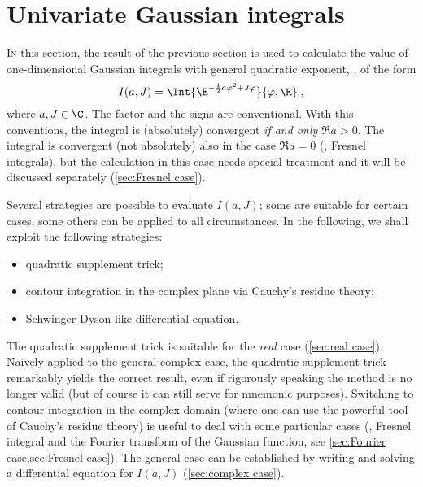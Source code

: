 \section{Univariate Gaussian integrals}
\label{sec:univariate gaussian integrals}

\ChangeExp

\lettrine{I}{n} this section, the result of the previous section is used to
calculate the value of 
one-dimensional Gaussian integrals with general quadratic exponent, \ie, of the
form
\begin{equation}\label{eq:ZaJ}
   I(a,J) = \Int{\E^{-\frac{1}{2} a \varphi^{2} + J\varphi }}{\varphi, \R}  \; ,
\end{equation}
where $a,J\in\C$. The factor  and the signs are conventional.
With this conventions, the integral is (absolutely) convergent \emph{if and
   only} $\Re a > 0$. The integral is convergent (not
absolutely) also in the case $\Re a = 0$ (\ie, Fresnel integrals), but
the calculation in this case needs special treatment and it will be discussed
separately (\cref{sec:Fresnel case}).

Several strategies are possible to evaluate $I(a,J)$; some are suitable for
certain cases, some others can be applied to all circumstances. In the
following, we shall exploit the following strategies:
\begin{itemize}
   \item quadratic supplement trick;
   \item contour integration in the complex plane via Cauchy's residue theory;
   \item Schwinger-Dyson like differential equation.
\end{itemize}

The quadratic supplement trick is suitable for the \emph{real} case
(\cref{sec:real case}). Naively applied to the general complex case, the
quadratic supplement trick remarkably yields the correct result, even if
rigorously speaking the method is no longer valid (but of course it can still
serve for mnemonic purposes). Switching to contour integration in the complex
domain (where one can use the powerful tool of Cauchy's residue theory) is
useful to deal with some particular cases (\eg, Fresnel integral and the Fourier
transform of the Gaussian function, see \cref{sec:Fourier case,sec:Fresnel
   case}). The general case can be established by writing and solving a
differential equation for $I(a,J)$ (\cref{sec:complex case}).

